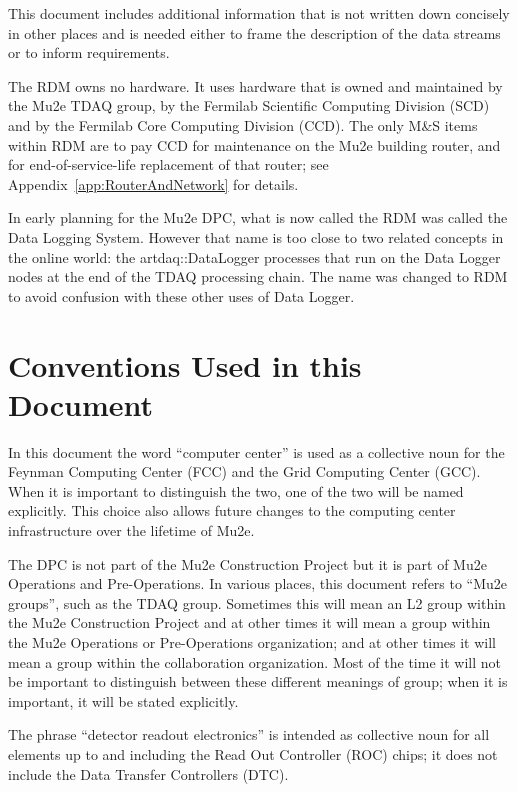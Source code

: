 This document includes additional information that is not written down concisely
in other places and is needed either to frame the description of the data streams
or to inform requirements.


The RDM owns no hardware.  It uses hardware that is owned and maintained
by the Mu2e TDAQ group,
by the Fermilab Scientific Computing Division (SCD)
and by the Fermilab Core Computing Division (CCD).
The only M\&S items within RDM are to pay CCD for maintenance on the Mu2e building router,
and for end-of-service-life replacement of that router;
see Appendix~\ref{app:RouterAndNetwork} for details.

In early planning for the Mu2e DPC, what is now called the RDM was called the Data Logging System.
However that name is too close to two related concepts in the online world:
the {\code artdaq::DataLogger} processes that run on the Data Logger nodes at the end of the TDAQ
processing chain.  The name was changed to RDM to avoid confusion with these other uses of Data Logger.

\section{Conventions Used in this Document}

In this document the word ``computer center'' is used as a collective noun for the
Feynman Computing Center (FCC) and the Grid Computing Center (GCC).
When it is important to distinguish the two, one of the two will be named explicitly.
This choice also allows future changes to the computing center infrastructure over the
lifetime of Mu2e.

The DPC is not part of the Mu2e Construction Project but it is part of Mu2e Operations
and Pre-Operations.
In various places, this document refers to ``Mu2e groups'', such as the TDAQ group.
Sometimes this will mean an L2 group within the Mu2e Construction Project and at other
times it will mean a group within the Mu2e Operations or Pre-Operations organization;
and at other times it will mean a group within the collaboration organization.
Most of the time it will not be important to distinguish between these different meanings
of group; when it is important, it will be stated explicitly.

The phrase ``detector readout electronics'' is intended as collective noun for all elements
up to and including the Read Out Controller (ROC) chips; it does not include
the Data Transfer Controllers (DTC).


